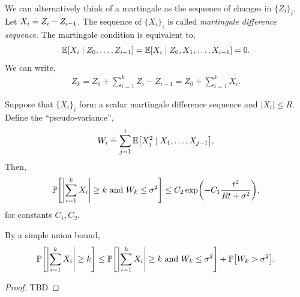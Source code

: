 We can alternatively think of a martingale as the sequence of changes in $\{Z_i\}_i$. Let $X_i \overset{.}{=} Z_i - Z_{i-1}$. The sequence of $\{X_i\}_i$ is called \emph{martingale difference sequence}. The martingale condition is equivalent to, \begin{align}
    \E{X_i \mid Z_0, \dots, Z_{i-1}} = \E{X_i \mid Z_0, X_1, \dots, X_{i-1}} = 0.
\end{align} We can write, \begin{align}
    Z_k = Z_0 + \sum_{i=1}^k Z_i - Z_{i-1} = Z_0 + \sum_{i=1}^k X_i.
\end{align}

\begin{thm}
    Suppose that $\{X_i\}_i$ form a scalar martingale difference sequence and $|X_i| \leq R$. Define the ``pseudo-variance'', \begin{align}
        W_i \defeq \sum_{j=1}^i \E{X_j^2 \mid X_1, \dots, X_{j-1}},
    \end{align} Then, \begin{align}
        \Pr{\abs{\sum_{i=1}^k X_i} \geq k \text{ and } W_k \leq \sigma^2} \leq C_2 \exp\parentheses*{-C_1 \frac{t^2}{Rt + \sigma^2}},
    \end{align} for constants $C_1, C_2$.
\end{thm}\noindent By a simple union bound, \begin{align}
    \Pr{\abs{\sum_{i=1}^k X_i} \geq k} \leq \Pr{\abs{\sum_{i=1}^k X_i} \geq k \text{ and } W_k \leq \sigma^2} + \Pr{W_k > \sigma^2}.
\end{align}
\begin{proof} TBD
\end{proof}